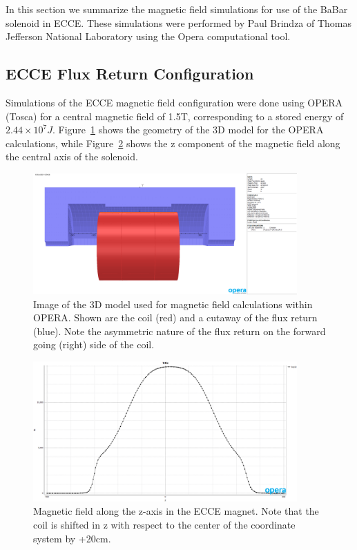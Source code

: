 In this section we summarize the magnetic field simulations for use of the BaBar solenoid in ECCE.  These simulations were performed by Paul Brindza of Thomas Jefferson National Laboratory using the Opera computational tool. 

\subsection{ECCE Flux Return Configuration}

Simulations of the ECCE magnetic field configuration were done using OPERA (Tosca) for a central magnetic field of 1.5T, corresponding to a stored energy of $2.44\times 10^{7} J$.  Figure~\ref{fig:3DModel} shows the geometry of the 3D model for the OPERA calculations, while Figure~\ref{fig:BzOnAxis} shows the z component of the magnetic field along the central axis of the solenoid. 

\begin{figure}[h!tbp]
    \centering
    \includegraphics[width=0.9\textwidth]{figs/3DModel.png}
    \caption{Image of the 3D model used for magnetic field calculations within OPERA. Shown are the coil (red) and a cutaway of the flux return (blue). Note the asymmetric nature of the flux return on the forward going (right) side of the coil. }
    \label{fig:3DModel}
\end{figure}

\begin{figure}[h!tbp]
    \centering
    \includegraphics[width=0.9\textwidth]{figs/BzOnAxis.png}
    \caption{Magnetic field along the z-axis in the ECCE magnet.  Note that the coil is shifted in z with respect to the center of the coordinate system by +20cm. }
    \label{fig:BzOnAxis}
\end{figure}

